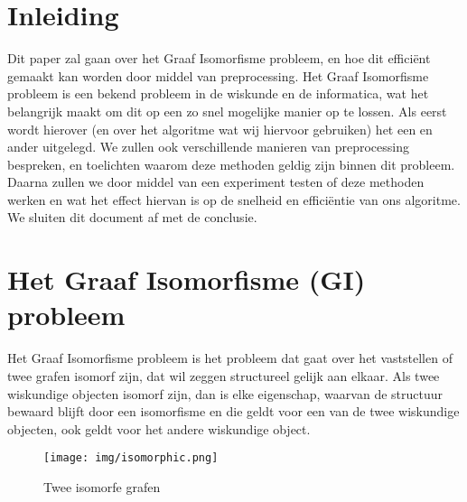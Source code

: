 \documentclass{article}
\begin{document}


\renewcommand*\contentsname{Inhoudsopgave}
\tableofcontents{}
\pagebreak


\section{Inleiding}
Dit paper zal gaan over het Graaf Isomorfisme probleem, en hoe dit effici\"ent gemaakt kan worden door middel van preprocessing. Het Graaf Isomorfisme probleem is een bekend probleem in de wiskunde en de informatica, wat het belangrijk maakt om dit op een zo snel mogelijke manier op te lossen. Als eerst wordt hierover (en over het algoritme wat wij hiervoor gebruiken) het een en ander uitgelegd. We zullen ook verschillende manieren van preprocessing bespreken, en toelichten waarom deze methoden geldig zijn binnen dit probleem. Daarna zullen we door middel van een experiment testen of deze methoden werken en wat het effect hiervan is op de snelheid en effici\"entie van ons algoritme. We sluiten dit document af met de conclusie.
\pagebreak


\section{Het Graaf Isomorfisme (GI) probleem}
Het Graaf Isomorfisme probleem is het probleem dat gaat over het vaststellen of twee grafen isomorf zijn, dat wil zeggen structureel gelijk aan elkaar. Als twee wiskundige objecten isomorf zijn, dan is elke eigenschap, waarvan de structuur bewaard blijft door een isomorfisme en die geldt voor een van de twee wiskundige objecten, ook geldt voor het andere wiskundige object.\\

\begin{wrapfigure}{r}{0.5\textwidth}
\renewcommand{\figurename}{Figuur}
\begin{center}
\texttt{[image: img/isomorphic.png]}
\end{center}
\caption{Twee isomorfe grafen}
\end{wrapfigure}
\end{document}
